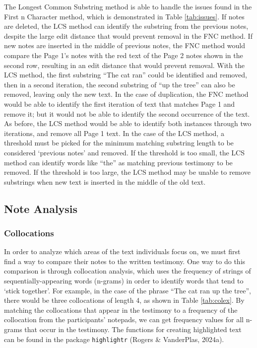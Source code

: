 \documentclass[print]{nuthesis}
\begin{document}
The Longest Common Substring method is able to handle the issues found in the First n Character method, which is demonstrated in Table \ref{tab:issues}.
If notes are deleted, the LCS method can identify the substring from the previous notes, despite the large edit distance that would prevent removal in the FNC method.
If new notes are inserted in the middle of previous notes, the FNC method would compare the Page 1's notes with the red text of the Page 2 notes shown in the second row, resulting in an edit distance that would prevent removal.
With the LCS method, the first substring ``The cat ran'' could be identified and removed, then in a second iteration, the second substring of ``up the tree'' can also be removed, leaving only the new text.
In the case of duplication, the FNC method would be able to identify the first iteration of text that matches Page 1 and remove it; but it would not be able to identify the second occurrence of the text.
As before, the LCS method would be able to identify both instances through two iterations, and remove all Page 1 text.
In the case of the LCS method, a threshold must be picked for the minimum matching substring length to be considered `previous notes' and removed.
If the threshold is too small, the LCS method can identify words like ``the'' as matching previous testimony to be removed.
If the threshold is too large, the LCS method may be unable to remove substrings when new text is inserted in the middle of the old text.

\hypertarget{note-analysis}{%
\subsection{Note Analysis}\label{note-analysis}}

\hypertarget{collocations}{%
\subsubsection{Collocations}\label{collocations}}

In order to analyze which areas of the text individuals focus on, we must first find a way to compare their notes to the written testimony.
One way to do this comparison is through collocation analysis, which uses the frequency of strings of sequentially-appearing words (n-grams) in order to identify words that tend to `stick together'.
For example, in the case of the phrase ``The cat ran up the tree'', there would be three collocations of length 4, as shown in Table \ref{tab:colex}.
By matching the collocations that appear in the testimony to a frequency of the collocation from the participants' notepads, we can get frequency values for all n-grams that occur in the testimony.
The functions for creating highlighted text can be found in the package \texttt{highlightr} (Rogers \& VanderPlas, 2024a).
\end{document}
